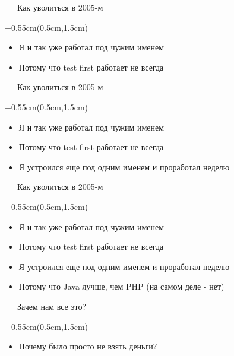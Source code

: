 \documentclass[xetex,18pt,aspectratio=169]{beamer}
\begin{document}
\begin{Large}
\begin{frame}{\ \ \ Как уволиться в 2005-м}
\begin{textblock*}{\framewidth+0.55cm}(0.5cm,1.5cm)
\begin{itemize}
  \item Я и так уже работал под чужим именем
  \item Потому что test first работает не всегда
\end{itemize}
\end{textblock*}
\end{frame}

\begin{frame}{\ \ \ Как уволиться в 2005-м}
\begin{textblock*}{\framewidth+0.55cm}(0.5cm,1.5cm)
\begin{itemize}
  \item Я и так уже работал под чужим именем
  \item Потому что test first работает не всегда
  \item Я устроился еще под одним именем и проработал неделю
\end{itemize}
\end{textblock*}
\end{frame}

\begin{frame}{\ \ \ Как уволиться в 2005-м}
\begin{textblock*}{\framewidth+0.55cm}(0.5cm,1.5cm)
\begin{itemize}
  \item Я и так уже работал под чужим именем
  \item Потому что test first работает не всегда
  \item Я устроился еще под одним именем и проработал неделю
  \item Потому что Java лучше, чем PHP (на самом деле - нет)
\end{itemize}
\end{textblock*}
\end{frame}

\begin{frame}{\ \ \ Зачем нам все это?}
\begin{textblock*}{\framewidth+0.55cm}(0.5cm,1.5cm)
\begin{itemize}
  \item Почему было просто не взять деньги?
\end{itemize}
\end{textblock*}
\end{frame}


\end{Large}
\end{document}
